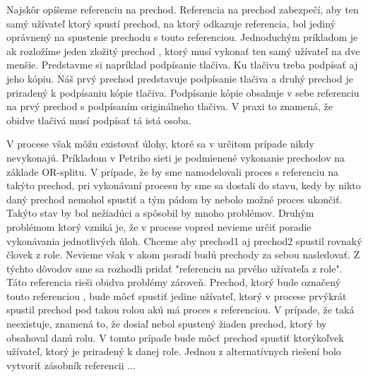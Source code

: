 Najskôr opíšeme referenciu na prechod. Referencia na prechod zabezpečí, aby ten samý užívateľ ktorý spustí prechod, na ktorý odkazuje referencia, bol jediný oprávnený na spustenie prechodu s touto referenciou. Jednoduchým príkladom je ak rozložíme jeden zložitý prechod , ktorý musí vykonať ten samý užívateľ na dve menšie. Predstavme si napríklad podpísanie tlačiva. Ku tlačivu treba podpísať aj jeho kópiu. Náš prvý prechod predstavuje podpísanie tlačiva a druhý prechod je priradený k podpísaniu kópie tlačiva. Podpísanie kópie obsahuje v sebe referenciu na prvý prechod s podpísaním originálneho tlačiva. V praxi to znamená, že obidve tlačivá musí podpísať tá istá osoba. 


V procese však môžu existovať úlohy, ktoré sa v určitom prípade nikdy nevykonajú. Príkladom v Petriho sieti je podmienené vykonanie prechodov na základe OR-splitu. V prípade, že by sme namodelovali proces s referenciu na takýto prechod, pri vykonávaní procesu by sme sa dostali do stavu, kedy by nikto daný prechod nemohol spustiť a tým pádom by nebolo možné proces ukončiť. Takýto stav by bol nežiadúci a spôsobil by mnoho problémov. Druhým problémom ktorý vzniká je, že v procese vopred nevieme určiť poradie vykonávania jednotlivých úloh. Chceme aby prechod1 aj prechod2 spustil rovnaký človek z role. Nevieme však v akom poradí budú prechody za sebou nasledovať. Z týchto dôvodov sme sa rozhodli pridať "referenciu na prvého užívateľa z role". Táto referencia rieši obidva problémy zároveň. Prechod, ktorý bude označený touto referenciou , bude môcť spustiť jedine užívateľ, ktorý v procese prvýkrát spustil prechod pod takou rolou akú má proces s referenciou. V prípade, že taká neexistuje, znamená to, že dosiaľ nebol spustený žiaden prechod, ktorý by obsahoval danú rolu. V tomto prípade bude môcť prechod spustiť ktorýkoľvek užívateľ, ktorý je priradený k danej role. Jednou z alternatívnych riešení bolo vytvoriť zásobník referencii ...



